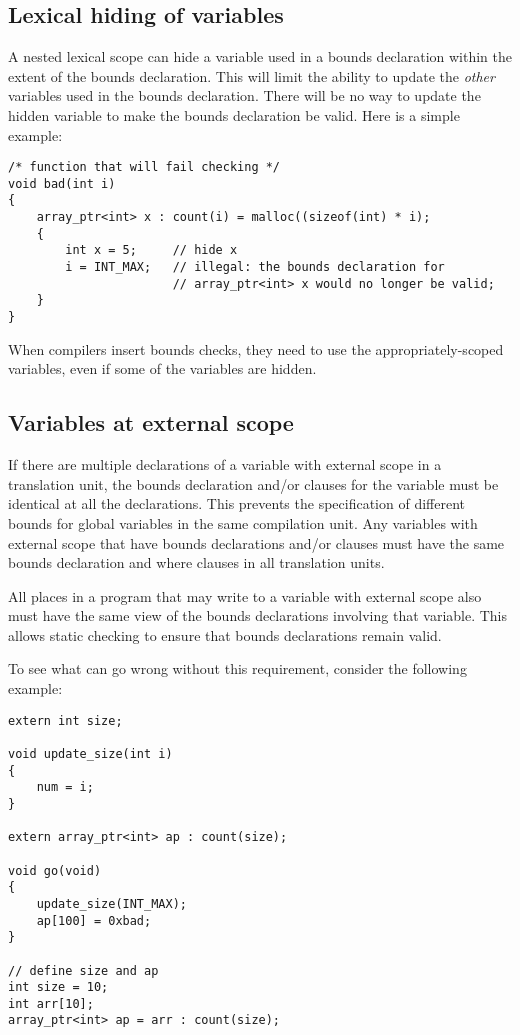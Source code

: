 \subsection{Lexical hiding of variables}

A nested lexical scope can hide a variable used in a bounds declaration
within the extent of the bounds declaration. This will limit the ability
to update the {\it other} variables used in the bounds declaration.  There will be
no way to update the hidden variable to make the bounds declaration be valid.
Here is a simple example:
\begin{lstlisting}
/* function that will fail checking */
void bad(int i)
{
    array_ptr<int> x : count(i) = malloc((sizeof(int) * i);
    {
        int x = 5;     // hide x
        i = INT_MAX;   // illegal: the bounds declaration for
                       // array_ptr<int> x would no longer be valid;
    }
}
\end{lstlisting}
When compilers insert bounds checks, they need to use the appropriately-scoped
variables, even if some of the variables are hidden.

\subsection{Variables at external scope}
\label{section:external-scope-variables}

If there are multiple declarations of a variable with external scope in
a translation unit, the bounds declaration and/or  clauses for the
variable must be identical at all the declarations. This prevents the
specification of different bounds for global variables in the same
compilation unit. Any variables with external scope that have bounds
declarations and/or  clauses must have the same bounds declaration
and where clauses in all translation units.

All places in a program that may write to a variable with external scope
also must have the same view of the bounds declarations involving that
variable. This allows static checking to ensure that bounds declarations
remain valid.

To see what can go wrong without this requirement, consider the
following example:

\begin{lstlisting}
extern int size;

void update_size(int i)
{
    num = i;
}

extern array_ptr<int> ap : count(size);

void go(void)
{
    update_size(INT_MAX);
    ap[100] = 0xbad;
}

// define size and ap
int size = 10;
int arr[10];
array_ptr<int> ap = arr : count(size);
\end{lstlisting}

